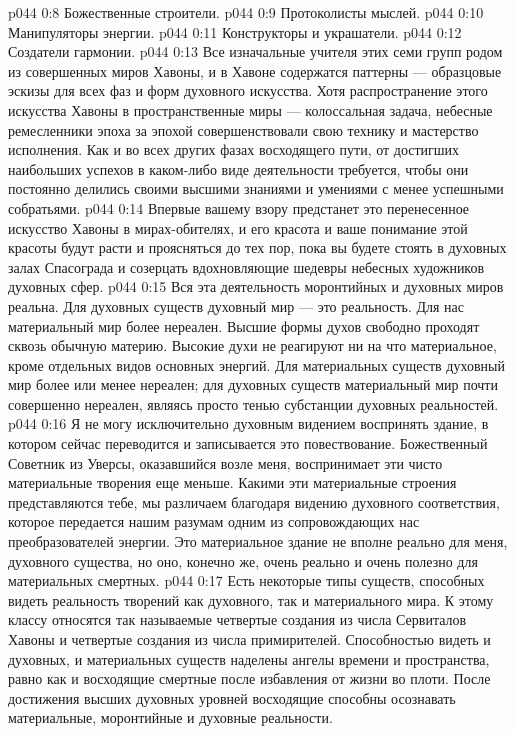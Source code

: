 \vs p044 0:8 \bibnobreakspace Божественные строители.
\vs p044 0:9 \bibnobreakspace Протоколисты мыслей.
\vs p044 0:10 \bibnobreakspace Манипуляторы энергии.
\vs p044 0:11 \bibnobreakspace Конструкторы и украшатели.
\vs p044 0:12 \bibnobreakspace Создатели гармонии.
\vs p044 0:13 \pc Все изначальные учителя этих семи групп родом из совершенных миров Хавоны, и в Хавоне содержатся паттерны --- образцовые эскизы для всех фаз и форм духовного искусства. Хотя распространение этого искусства Хавоны в пространственные миры --- колоссальная задача, небесные ремесленники эпоха за эпохой совершенствовали свою технику и мастерство исполнения. Как и во всех других фазах восходящего пути, от достигших наибольших успехов в каком\hyp{}либо виде деятельности требуется, чтобы они постоянно делились своими высшими знаниями и умениями с менее успешными собратьями.
\vs p044 0:14 Впервые вашему взору предстанет это перенесенное искусство Хавоны в мирах\hyp{}обителях, и его красота и ваше понимание этой красоты будут расти и проясняться до тех пор, пока вы будете стоять в духовных залах Спасограда и созерцать вдохновляющие шедевры небесных художников духовных сфер.
\vs p044 0:15 \pc Вся эта деятельность моронтийных и духовных миров реальна. Для духовных существ духовный мир --- это реальность. Для нас материальный мир более нереален. Высшие формы духов свободно проходят сквозь обычную материю. Высокие духи не реагируют ни на что материальное, кроме отдельных видов основных энергий. Для материальных существ духовный мир более или менее нереален; для духовных существ материальный мир почти совершенно нереален, являясь просто тенью субстанции духовных реальностей.
\vs p044 0:16 Я не могу исключительно духовным видением воспринять здание, в котором сейчас переводится и записывается это повествование. Божественный Советник из Уверсы, оказавшийся возле меня, воспринимает эти чисто материальные творения еще меньше. Какими эти материальные строения представляются тебе, мы различаем благодаря видению духовного соответствия, которое передается нашим разумам одним из сопровождающих нас преобразователей энергии. Это материальное здание не вполне реально для меня, духовного существа, но оно, конечно же, очень реально и очень полезно для материальных смертных.
\vs p044 0:17 Есть некоторые типы существ, способных видеть реальность творений как духовного, так и материального мира. К этому классу относятся так называемые четвертые создания из числа Сервиталов Хавоны и четвертые создания из числа примирителей. Способностью видеть и духовных, и материальных существ наделены ангелы времени и пространства, равно как и восходящие смертные после избавления от жизни во плоти. После достижения высших духовных уровней восходящие способны осознавать материальные, моронтийные и духовные реальности.
